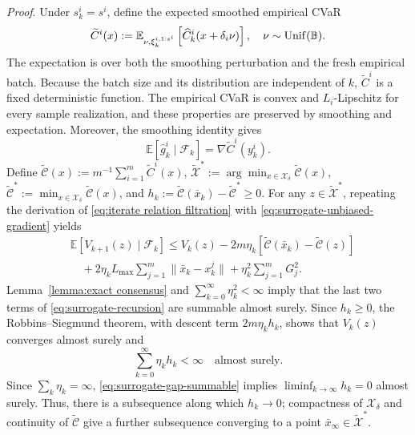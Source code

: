 \documentclass[twocolumn]{autart}    %
\newcommand{\brk}[1]{\left[#1\right]}
\newcommand{\1}{\mathbf{1}}
\begin{document}
\textit{Proof}.
Under $s_k^i=s^i$, define the expected smoothed empirical CVaR
\begin{align*}
\widetilde C^i(x)
 :=\mathbb E_{\nu,\xi_k^{i,1:s^i}}
\brk{\widehat C_k^i(x+\delta_i\nu)},
\quad \nu\sim{\rm Unif}(\mathbb B).
\end{align*}
The expectation is over both the smoothing perturbation and the fresh empirical batch. Because the batch size and its distribution are independent of $k$, $\widetilde C^i$ is a fixed deterministic function. The empirical CVaR is convex and $L_i$-Lipschitz for every sample realization, and these properties are preserved by smoothing and expectation. Moreover, the smoothing identity gives
\begin{equation}\label{eq:surrogate-unbiased-gradient}
\mathbb E\brk{\hat g_k^i\mid\mathcal F_k}
=\nabla \widetilde C^i(y_k^i).
\end{equation}
Define $\widetilde{\mathcal C}(x):=m^{-1}\sum_{i=1}^m\widetilde C^i(x)$,
$\widetilde{\mathcal X}^{\ast}:=\arg\min_{x\in\mathcal X_\delta}\widetilde{\mathcal C}(x)$,
$\widetilde{\mathcal C}^\ast:=\min_{x\in\mathcal X_\delta}\widetilde{\mathcal C}(x)$, and
$h_k:=\widetilde{\mathcal C}(\bar x_k)-\widetilde{\mathcal C}^\ast\geq0$.
For any $z\in\widetilde{\mathcal X}^{\ast}$, 
repeating the derivation of \eqref{eq:iterate relation filtration} with \eqref{eq:surrogate-unbiased-gradient} yields
\begin{align}
&\mathbb E\brk{V_{k+1}(z)\mid\mathcal F_k}
\leq V_k(z)
-2m\eta_k\brk{\widetilde{\mathcal C}(\bar x_k)
-\widetilde{\mathcal C}(z)}\nonumber\\
&\quad+2\eta_kL_{\max}
\sum_{j=1}^m\|\bar x_k-x_k^j\|
+\eta_k^2\sum_{j=1}^mG_j^2.
\label{eq:surrogate-recursion}
\end{align}
Lemma~\ref{lemma:exact consensus} and $\sum_{k=0}^\infty\eta_k^2<\infty$ imply that the last two terms of \eqref{eq:surrogate-recursion} are summable almost surely. Since $h_k\geq0$, the Robbins--Siegmund theorem, with descent term $2m\eta_kh_k$, shows that $V_k(z)$ converges almost surely and
\begin{equation}\label{eq:surrogate-gap-summable}
\sum_{k=0}^\infty\eta_kh_k<\infty
\quad\text{almost surely}.
\end{equation}
Since $\sum_k\eta_k=\infty$, \eqref{eq:surrogate-gap-summable} implies $\liminf_{k\to\infty}h_k=0$ almost surely. Thus, there is a subsequence along which $h_k\to0$; compactness of $\mathcal X_\delta$ and continuity of $\widetilde{\mathcal C}$ give a further subsequence converging to a point $\bar x_\infty\in\widetilde{\mathcal X}^{\ast}$.
\end{document}

